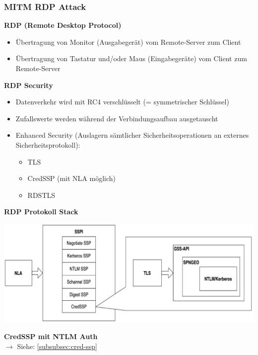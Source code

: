 \subsubsection{MITM RDP Attack}
\textbf{RDP (Remote Desktop Protocol)}
\begin{itemize}
    \item Übertragung von Monitor (Ausgabegerät) vom Remote-Server zum Client
    \item Übertragung von Tastatur und/oder Maus (Eingabegeräte) vom Client zum Remote-Server
\end{itemize}
\textbf{RDP Security}
\begin{itemize}
    \item Datenverkehr wird mit RC4 verschlüsselt (= symmetrischer Schlüssel)
    \item Zufallswerte werden während der Verbindungsaufbau ausgetauscht
    \item Enhanced Security (Auslagern sämtlicher Sicherheitsoperationen an externes Sicherheitsprotokoll):
    \begin{itemize}
        \item TLS
        \item CredSSP (mit NLA möglich)
        \item RDSTLS
    \end{itemize}
\end{itemize}
\textbf{RDP Protokoll Stack}
\begin{center}
    \vspace{-8pt}
    \includegraphics[width=1.0\linewidth]{./img/09-mitm/rdp_proto}
    \vspace{-8pt}
\end{center}
\textbf{CredSSP mit NTLM Auth}\\
$\rightarrow$ Siehe: \ref{subsubsec:cred-ssp}

